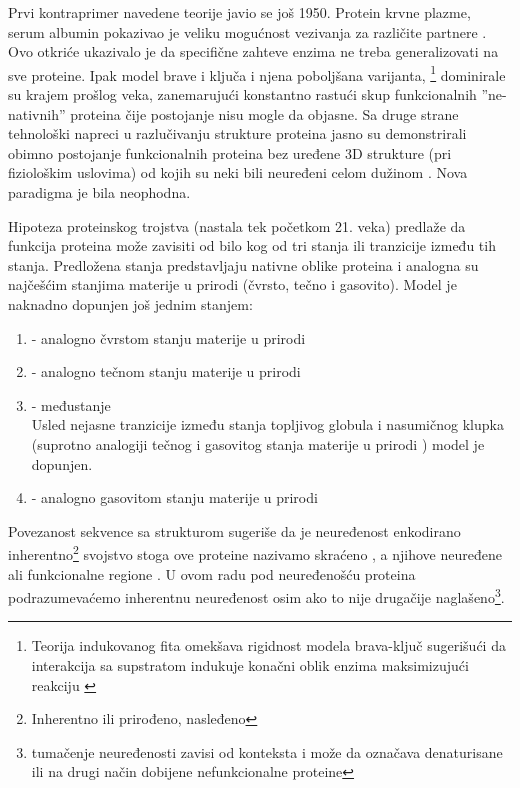 Prvi kontraprimer navedene teorije javio se još 1950. Protein krvne plazme, serum
albumin pokazivao je veliku mogućnost vezivanja za različite
partnere \parencite{dunker2001}. Ovo otkriće ukazivalo je da specifične zahteve
enzima ne treba generalizovati na sve proteine. Ipak model brave i ključa i
njena poboljšana varijanta, \footnote{ Teorija
indukovanog fita omekšava rigidnost modela brava-ključ sugerišući da interakcija
sa supstratom indukuje konačni oblik enzima maksimizujući
reakciju \parencite{biology}}  dominirale su krajem
prošlog veka, zanemarujući konstantno rastući skup funkcionalnih
''ne-nativnih'' proteina čije postojanje nisu mogle da objasne. Sa druge strane
tehnološki napreci u razlučivanju strukture proteina jasno su demonstrirali
obimno postojanje funkcionalnih proteina bez uređene 3D strukture (pri
fiziološkim uslovima)  od kojih su neki bili neuređeni celom
dužinom \parencite{dunker2001}.  Nova paradigma je bila neophodna.

Hipoteza proteinskog trojstva \parencite{dunker2001} (nastala tek početkom
21. veka) predlaže da funkcija proteina može zavisiti od bilo kog od tri
stanja ili tranzicije između tih stanja. Predložena stanja predstavljaju
nativne oblike proteina i analogna su najčešćim stanjima materije u prirodi
(čvrsto, tečno i gasovito).  Model je naknadno dopunjen još jednim stanjem:
\begin{enumerate}
  \item {} - analogno čvrstom stanju materije u prirodi

  \item {}  - analogno tečnom stanju materije u prirodi

  \item {}  - međustanje\\ 
    Usled nejasne tranzicije između stanja topljivog globula i nasumičnog
    klupka (suprotno analogiji tečnog i gasovitog stanja materije u prirodi \parencite{dunker2001})
    model je dopunjen.

  \item {}  - analogno gasovitom stanju materije u prirodi
\end{enumerate}

Povezanost sekvence sa strukturom sugeriše da je neuređenost enkodirano
inherentno\footnote{ Inherentno ili prirođeno, nasleđeno} svojstvo \parencite{dunker2001}
stoga ove proteine nazivamo 
 skraćeno , a njihove neuređene
ali funkcionalne regione  \parencite{uversky2016}. U ovom radu pod
neuređenošću proteina podrazumevaćemo inherentnu neuređenost osim ako to nije
drugačije naglašeno\footnote{ tumačenje neuređenosti zavisi od konteksta i može
  da označava denaturisane ili na drugi način dobijene nefunkcionalne
proteine}.

